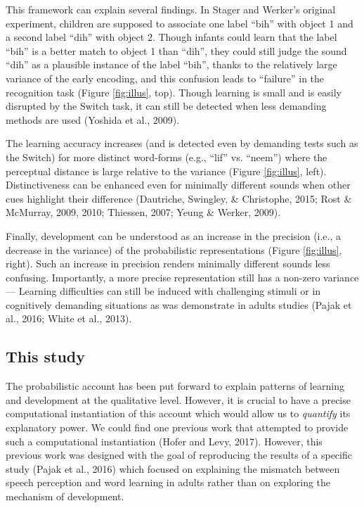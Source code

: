 \documentclass[english,,man,floatsintext]{apa6}
\theoremstyle{definition}
\theoremstyle{definition}
\theoremstyle{definition}
\theoremstyle{remark}
\begin{document}
This framework can explain several findings. In Stager and Werker's
original experiment, children are supposed to associate one label
\enquote{bih} with object 1 and a second label \enquote{dih} with object
2. Though infants could learn that the label \enquote{bih} is a better
match to object 1 than \enquote{dih}, they could still judge the sound
\enquote{dih} as a plausible instance of the label \enquote{bih}, thanks
to the relatively large variance of the early encoding, and this
confusion leads to \enquote{failure} in the recognition task (Figure
\ref{fig:illus}, top). Though learning is small and is easily disrupted
by the Switch task, it can still be detected when less demanding methods
are used (Yoshida et al., 2009).

The learning accuracy increases (and is detected even by demanding tests
such as the Switch) for more distinct word-forms (e.g., \enquote{lif}
vs. \enquote{neem}) where the perceptual distance is large relative to
the variance (Figure \ref{fig:illus}, left). Distinctiveness can be
enhanced even for minimally different sounds when other cues highlight
their difference (Dautriche, Swingley, \& Christophe, 2015; Rost \&
McMurray, 2009, 2010; Thiessen, 2007; Yeung \& Werker, 2009).

Finally, development can be understood as an increase in the precision
(i.e., a decrease in the variance) of the probabilistic representations
(Figure \ref{fig:illus}, right). Such an increase in precision renders
minimally different sounds less confusing. Importantly, a more precise
representation still has a non-zero variance --- Learning difficulties
can still be induced with challenging stimuli or in cognitively
demanding situations as was demonstrate in adults studies (Pajak et al.,
2016; White et al., 2013).

\subsection{This study}\label{this-study}

The probabilistic account has been put forward to explain patterns of
learning and development at the qualitative level. However, it is
crucial to have a precise computational instantiation of this account
which would allow us to \emph{quantify} its explanatory power. We could
find one previous work that attempted to provide such a computational
instantiation (Hofer and Levy, 2017). However, this previous work was
designed with the goal of reproducing the results of a specific study
(Pajak et al., 2016) which focused on explaining the mismatch between
speech perception and word learning in adults rather than on exploring
the mechanism of development.
\end{document}
